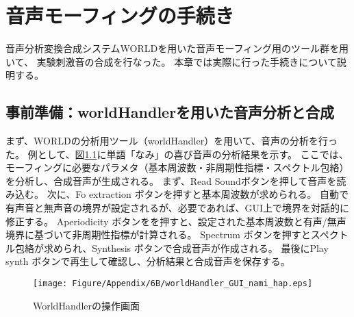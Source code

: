 \chapter{音声モーフィングの手続き}
\label{sec:MorphingAppendix}
音声分析変換合成システムWORLD\cite{morise2016world}を用いた音声モーフィング用のツール群\cite{kawahara2022WORLDGUI_J,kawahara2024interactive,kawahara2024WORLDGUI}を用いて、
実験刺激音の合成を行なった。
本章では実際に行った手続きについて説明する。

\section{事前準備：worldHandlerを用いた音声分析と合成}
\label{sec:WORLDHandler}
まず、WORLDの分析用ツール（worldHandler）を用いて、音声の分析を行った。
例として、図\ref{fig:worldHandler}に単語「なみ」の喜び音声の分析結果を示す。
ここでは、モーフィングに必要なパラメタ（基本周波数・非周期性指標・スペクトル包絡）を分析し、合成音声が生成される。
まず、Read Soundボタンを押して音声を読み込む。
次に、Fo extraction ボタンを押すと基本周波数が求められる。
自動で有声音と無声音の境界が設定されるが、必要であれば、GUI上で境界を対話的に修正する。
Aperiodicity ボタンをを押すと、設定された基本周波数と有声/無声境界に基づいて非周期性指標が計算される。
Spectrum ボタンを押すとスペクトル包絡が求められ、Synthesis ボタンで合成音声が作成される。
最後にPlay synth ボタンで再生して確認し、分析結果と合成音声を保存する。


\begin{figure}[h]
  \vspace{10pt}
  \centering
  \texttt{[image: Figure/Appendix/6B/worldHandler\_GUI\_nami\_hap.eps]} 
  \caption{
    WorldHandlerの操作画面
    }
  \label{fig:worldHandler}
\end{figure}



